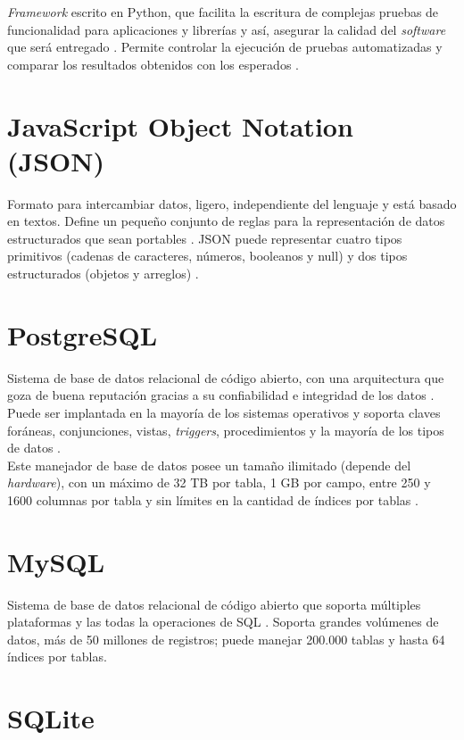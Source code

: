 \textit{Framework} escrito en Python, que facilita la escritura de
complejas pruebas de funcionalidad para aplicaciones y librerías y así,
asegurar la calidad del \textit{software} que será entregado \cite{pytest}. Permite controlar la ejecución de pruebas automatizadas y comparar los resultados obtenidos con los esperados \cite{pytest}.

\section{JavaScript Object Notation (JSON)}

Formato para intercambiar datos, ligero, independiente del lenguaje y está basado en textos. Define un pequeño conjunto de reglas para la representación de datos estructurados que sean portables \cite{JSON}. JSON puede representar cuatro tipos primitivos (cadenas de caracteres, números, booleanos y null) y dos tipos estructurados (objetos y arreglos) \cite{JSON}.

\section{PostgreSQL}

Sistema de base de datos relacional de código abierto, con una arquitectura que goza de buena reputación gracias a su confiabilidad e integridad de los datos \cite{PostgreSQL}. Puede ser implantada en la mayoría de los sistemas operativos y soporta claves foráneas, conjunciones, vistas, \textit{triggers}, procedimientos y la mayoría de los tipos de datos \cite{PostgreSQL}. \\

Este manejador de base de datos posee un tamaño ilimitado (depende del \textit{hardware}), con un máximo de 32 TB por tabla, 1 GB por campo, entre 250 y 1600 columnas por tabla y sin límites en la cantidad de índices por tablas \cite{PostgreSQL}.

\section{MySQL}

Sistema de base de datos relacional de código abierto que soporta múltiples plataformas y las todas la operaciones de SQL \cite{MySQL}. Soporta grandes volúmenes de datos, más de 50 millones de registros; puede manejar 200.000 tablas y hasta 64 índices por tablas\cite{MySQL}.

\section{SQLite}

